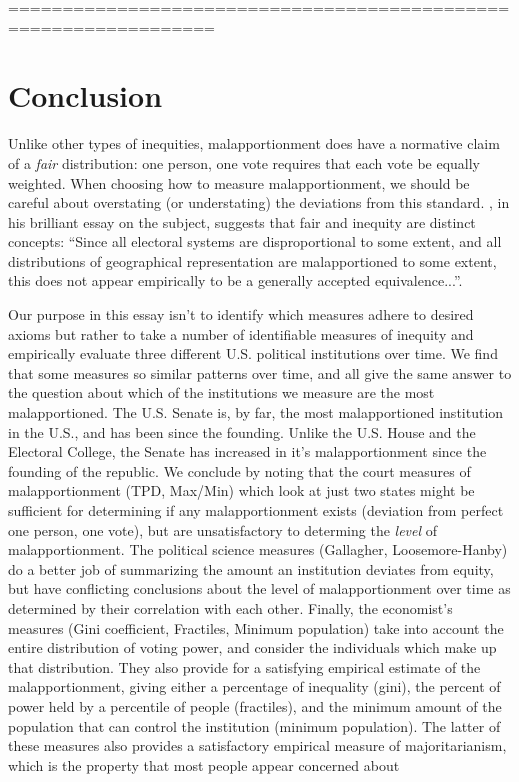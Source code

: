 =================================================================
\section{Conclusion} \label{sec:conclusion}
% 
Unlike other types of inequities, malapportionment does have a normative claim of a \textit{fair} distribution: one person, one vote requires that each vote be equally weighted. When choosing how to measure malapportionment, we should be careful about overstating (or understating) the deviations from this standard. \citet[][]{Monroe1994}, in his brilliant essay on the subject, suggests that fair and inequity are distinct concepts: ``Since all electoral systems are disproportional to some extent, and all distributions of geographical representation are malapportioned to some extent, this does not appear empirically to be a generally accepted equivalence...''. 

Our purpose in this essay isn't to identify which measures adhere to desired axioms but rather to take a number of identifiable measures of inequity and empirically evaluate three different U.S. political institutions over time. We find that some measures so similar patterns over time, and all give the same answer to the question about which of the institutions we measure are the most malapportioned. The U.S. Senate is, by far, the most malapportioned institution in the U.S., and has been since the founding. Unlike the U.S. House and the Electoral College, the Senate has increased in it's malapportionment since the founding of the republic. We conclude by noting that the court measures of malapportionment (TPD, Max/Min) which look at just two states might be sufficient for determining if any malapportionment exists (deviation from perfect one person, one vote), but are unsatisfactory to determing the \textit{level} of malapportionment. The political science measures (Gallagher, Loosemore-Hanby) do a better job of summarizing the amount an institution deviates from equity, but have conflicting conclusions about the level of malapportionment over time as determined by their correlation with each other. Finally, the economist's measures (Gini coefficient, Fractiles, Minimum population) take into account the entire distribution of voting power, and consider the individuals which make up that distribution. They also provide for a satisfying empirical estimate of the malapportionment, giving either a percentage of inequality (gini), the percent of power held by a percentile of people (fractiles), and the minimum amount of the population that can control the institution (minimum population). The latter of these measures also provides a satisfactory empirical measure of majoritarianism, which is the property that most people appear concerned about 



